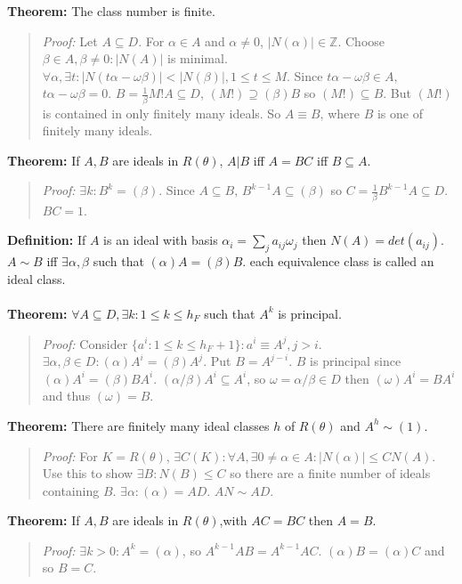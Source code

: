 {\bf Theorem:}
The class number is finite.
\begin{quote}
\emph{Proof:} 
Let $A \subseteq D$.  For $\alpha \in A$ and $\alpha \ne 0$, $|N(\alpha)| \in {\mathbb Z}$.
Choose $\beta \in A, \beta \ne 0: |N(A)|$ is minimal.  $\forall \alpha, \exists t:
|N(t \alpha - \omega \beta )| < |N(\beta)|, 1 \leq t \leq M$.  Since
$t \alpha - \omega \beta \in A$,
$t \alpha - \omega \beta = 0$.  $B = {\frac 1 {\beta}} M! A \subseteq D$,  $ (M!) \supseteq (\beta)B$ so
$(M!) \subseteq B$.  But $(M!)$ is contained in only finitely many ideals.  So $A \equiv B$, where
$B$ is one of finitely many ideals.
\end{quote}
{\bf Theorem:}
If $A, B$ are ideals in $R(\theta)$, $A|B$ iff $A=BC$ iff $B \subseteq A$.
\begin{quote}
\emph{Proof:} 
$\exists k: B^k = (\beta)$.  Since $A \subseteq B$, $B^{k-1} A \subseteq (\beta)$ so
$C= {\frac 1 {\beta}} B^{k-1}A \subseteq D$.  $BC=1$.
\end{quote}
{\bf Definition:}
If $A$ is an ideal with basis $\alpha_i= \sum_j a_{ij} \omega_j$ then
$N(A)= det (a_{ij})$.
$A \sim B$ iff $\exists \alpha, \beta$ such that $(\alpha)A=(\beta)B$.
each equivalence class is called an ideal class.
\\
\\
{\bf Theorem:} $\forall A \subseteq D, \exists k: 1 \leq k \leq h_F$ such that $A^k$ is principal.
\begin{quote}
\emph{Proof:} 
Consider $\{ a^i : 1 \leq k \leq h_F+1 \} : a^i \equiv A^j, j>i$.  $\exists \alpha , \beta \in D:
(\alpha) A^i= (\beta) A^j$.  Put $B= A^{j-i}$.  $B$ is principal since
$(\alpha) A^i = (\beta) B A^i$.  $( \alpha / \beta ) A^i \subseteq A^i$, so
$\omega= \alpha / \beta \in D$ then $(\omega) A^i = B A^i$ and thus $(\omega)= B$.
\end{quote}
{\bf Theorem:}
There are finitely many ideal classes $h$ of $R(\theta)$ and $A^h \sim
(1)$.
\begin{quote}
\emph{Proof:} 
For $K=R(\theta)$, $\exists C(K): \forall A, \exists 0 \ne \alpha \in A:
|N(\alpha)| \leq C N(A)$.  Use this to show $\exists B:N(B) \leq C$ so there are a finite
number of ideals containing $B$. $\exists \alpha: (\alpha)=AD$.  $AN \sim AD$.
\end{quote}
{\bf Theorem:}
If $A, B$ are ideals in $R(\theta)$,with  $AC=BC$ then $A=B$.
\begin{quote}
\emph{Proof:} $\exists k>0: A^k= (\alpha)$, so
$A^{k-1}AB = A^{k-1} AC$.  $(\alpha) B = (\alpha) C$ and so $B=C$.
\end{quote}
